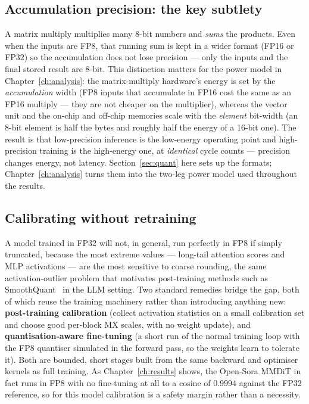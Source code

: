 \documentclass[11pt]{report}
\begin{document}
\subsection{Accumulation precision: the key subtlety}

A matrix multiply multiplies many 8-bit numbers and \emph{sums} the
products. Even when the inputs are FP8, that running sum is kept in a wider
format (FP16 or FP32) so the accumulation does not lose precision --- only
the inputs and the final stored result are 8-bit. This distinction matters
for the power model in Chapter~\ref{ch:analysis}: the matrix-multiply
hardware's energy is set by the \emph{accumulation} width (FP8 inputs that
accumulate in FP16 cost the same as an FP16 multiply --- they are not
cheaper on the multiplier), whereas the vector unit and the on-chip and
off-chip memories scale with the \emph{element} bit-width (an 8-bit element
is half the bytes and roughly half the energy of a 16-bit one). The result
is that low-precision inference is the low-energy operating point and
high-precision training is the high-energy one, at \emph{identical} cycle
counts --- precision changes energy, not latency. Section~\ref{sec:quant}
here sets up the formats; Chapter~\ref{ch:analysis} turns them into the
two-leg power model used throughout the results.

\subsection{Calibrating without retraining}

A model trained in FP32 will not, in general, run perfectly in FP8 if
simply truncated, because the most extreme values --- long-tail attention
scores and MLP activations --- are the most sensitive to coarse rounding,
the same activation-outlier problem that motivates post-training methods such
as SmoothQuant~\cite{xiao2023smoothquant} in the LLM setting.
Two standard remedies bridge the gap, both of which reuse the training
machinery rather than introducing anything new: \textbf{post-training
calibration} (collect activation statistics on a small calibration set and
choose good per-block MX scales, with no weight update), and
\textbf{quantisation-aware fine-tuning} (a short run of the normal training
loop with the FP8 quantiser simulated in the forward pass, so the weights
learn to tolerate it). Both are bounded, short stages built from the same
backward and optimiser kernels as full training. As Chapter~\ref{ch:results}
shows, the Open-Sora MMDiT in fact runs in FP8 with no fine-tuning at all
to a cosine of $0.9994$ against the FP32 reference, so for this model
calibration is a safety margin rather than a necessity.
\end{document}
